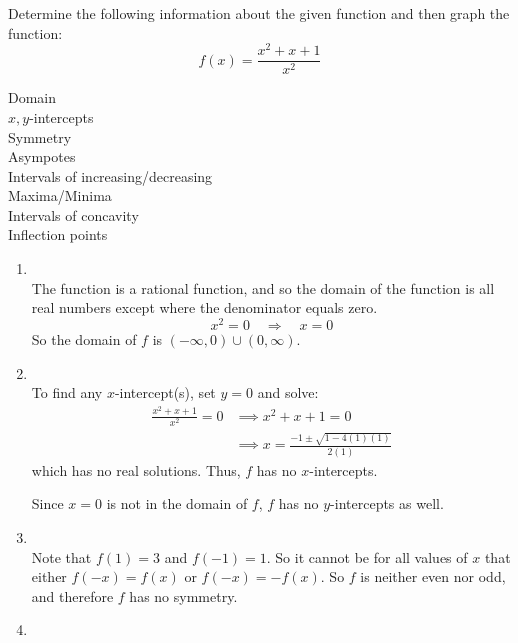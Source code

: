 \documentclass[nooutcomes]{ximera}
\begin{document}
\begin{problem}

  Determine the following information about the given function and then graph the function:
  \[ 
    f(x) = \frac{x^2 + x + 1}{x^2}
  \]
  
  Domain\\
  $x,y$-intercepts\\
  Symmetry\\
  Asympotes\\
  Intervals of increasing/decreasing\\
  Maxima/Minima\\
  Intervals of concavity\\
  Inflection points
  
  \begin{freeResponse}
    \mbox{}
    \begin{enumerate}
      \item  
          \\
        
        The function is a rational function, and so the domain of the function is all real numbers except where the denominator equals zero.
        \[
          x^2 = 0 \quad \Longrightarrow \quad x=0
        \]
	So the domain of $f$ is $(-\infty ,0)\cup (0,\infty )$.


      \item
          \\
        To find any $x$-intercept(s), set $y=0$ and solve:
        \begin{align*}
          \frac{x^2 + x + 1}{x^2} = 0 &\implies x^2 + x + 1 = 0 \\
          &\implies x = \frac{-1 \pm \sqrt{1-4(1)(1)}}{2(1)}
        \end{align*}
	which has no real solutions.
        Thus, $f$ has no $x$-intercepts.
			
	Since $x=0$ is not in the domain of $f$, $f$ has no $y$-intercepts as well.
 
     \item 
         \\

       Note that $f(1) = 3$ and $f(-1) = 1$.
       So it cannot be for all values of $x$ that either $f(-x) = f(x)$ or $f(-x) = -f(x)$.
       So $f$ is neither even nor odd, and therefore $f$ has no symmetry.
			
     \item
         \\


\end{enumerate}
\end{freeResponse}
\end{problem}
\end{document}
